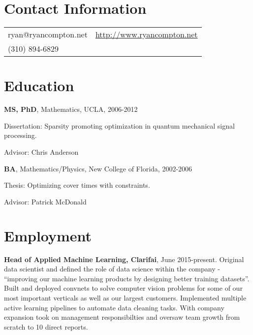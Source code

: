 \documentclass[margin,line]{res}
\newenvironment{list1}{
  \begin{list}{\ding{113}}{%
      \setlength{\itemsep}{0in}
      \setlength{\parsep}{0in} \setlength{\parskip}{0in}
      \setlength{\topsep}{0in} \setlength{\partopsep}{0in} 
      \setlength{\leftmargin}{0.17in}}}{\end{list}}
\begin{document}

\begin{resume}
\section{\sc Contact Information}
\vspace{.05in}
\begin{tabular}{@{}p{2in}p{4in}}
    ryan@ryancompton.net   &  \url{http://www.ryancompton.net} \\         
(310) 894-6829 & \\
\end{tabular}

\section{\sc Education}
    {\bf MS, PhD}, Mathematics, UCLA, 2006-2012\\
\vspace*{-.1in}
\begin{list1}
\item [] Dissertation: Sparsity promoting optimization in quantum mechanical signal processing.
\item [] Advisor: Chris Anderson
\end{list1}

    {\bf BA}, Mathematics/Physics, New College of Florida, 2002-2006\\
\vspace*{-.1in}
\begin{list1}
\item [] Thesis: Optimizing cover times with constraints.
\item [] Advisor: Patrick McDonald
\end{list1}

\section{\sc Employment}
    {\bf Head of Applied Machine Learning, Clarifai}, June 2015-present. Original data scientist and defined the role of data science within the company - ``improving our machine learning products by designing better training datasets''. Built and deployed convnets to solve computer vision problems for some of our most important verticals as well as our largest customers. Implemented multiple active learning pipelines to automate data cleaning tasks. With company expansion took on management responsibilties and oversaw team growth from scratch to 10 direct reports.   
    

\end{resume}
\end{document}
